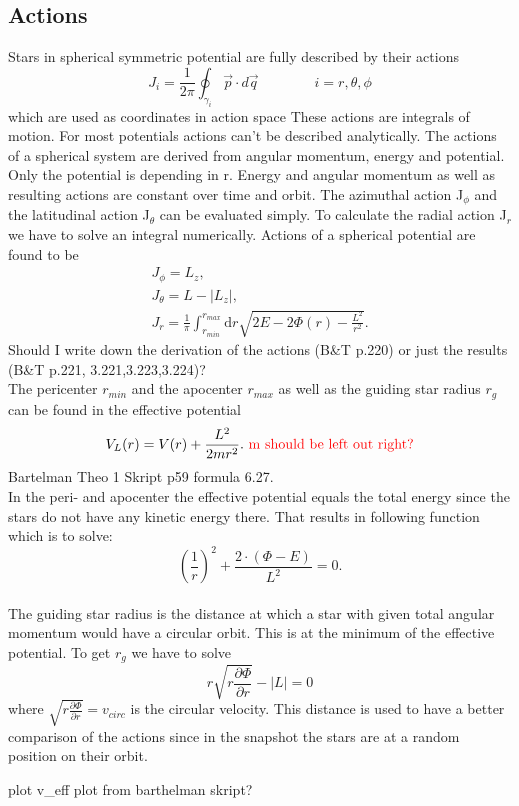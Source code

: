 \subsection{Actions}
Stars in spherical symmetric potential are fully described by their actions \begin{equation}
J_i=\frac{1}{2\pi}\oint_{\gamma_i}\vec{p}\cdot d\vec{q} \qquad\qquad i=r,\theta,\phi
\end{equation} which are used as coordinates in action space
These actions are integrals of motion. For most potentials actions can't be described analytically. The actions of a spherical system are derived from angular momentum, energy and potential. Only the potential is depending in r. Energy and angular momentum as well as resulting actions are constant over time and orbit. The azimuthal action J\(_\phi\) and the latitudinal action J\(_\theta\) can be evaluated simply. To calculate the radial action J\(_r\) we have to solve an integral numerically. Actions of a spherical potential are found to be \begin{align}
J_\phi=L_z, \\ J_\theta=L-|L_z|, \\ J_r=\frac{1}{\pi} \int_{r_{min}}^{r_{max}} \mathrm{d}r \sqrt{2E-2\Phi(r)-\frac{L^2}{r^2}}.
\end{align}\color{red} Should I write down the derivation of the actions (B\&T p.220) or just the results (B\&T p.221, 3.221,3.223,3.224)?\color{black} \\ The pericenter \(r_{min}\) and the apocenter \(r_{max}\) as well as the guiding star radius \(r_g\) can be found in the effective potential \begin{equation}
V_L(r)=V(r)+\frac{L^2}{2mr^2}.\  \color{red} \mathrm{m\ should\ be\ left\ out\ right?} \color{black}
\end{equation} \color{red} Bartelman Theo 1 Skript p59 formula 6.27. \\ \color{black} In the peri- and apocenter the effective potential equals the total energy since the stars do not have any kinetic energy there. That results in following function which is to solve: \[\left(\frac{1}{r}\right)^2+\frac{2\cdot (\Phi-E)}{L^2}=0.\] \\ The guiding star radius is the distance at which a star with given total angular momentum would have a circular orbit. This is at the minimum of the effective potential. To get \(r_g\) we have to solve \[r\sqrt{r\frac{\partial\Phi}{\partial r}}-|L|=0\] where \(\sqrt{r\frac{\partial\Phi}{\partial r}}=v_{circ}\) is the circular velocity. This distance is used to have a better comparison of the actions since in the snapshot the stars are at a random position on their orbit.

\color{red} plot v\_eff plot from barthelman skript? \color{black}
